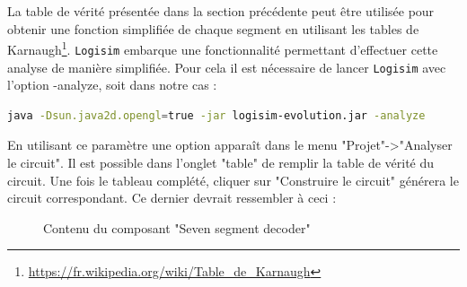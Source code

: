 \documentclass{article}
\begin{document}
    La table de vérité présentée dans la section précédente peut être utilisée pour obtenir une fonction simplifiée de chaque segment en utilisant les tables de Karnaugh\footnote{\url{https://fr.wikipedia.org/wiki/Table_de_Karnaugh}}.
    \texttt{Logisim} embarque une fonctionnalité permettant d'effectuer cette analyse de manière simplifiée.
    Pour cela il est nécessaire de lancer \texttt{Logisim} avec l'option -analyze, soit dans notre cas :

    \begin{lstlisting}[language=bash]
java -Dsun.java2d.opengl=true -jar logisim-evolution.jar -analyze
    \end{lstlisting}

    En utilisant ce paramètre une option apparaît dans le menu "Projet"->"Analyser le circuit".
    Il est possible dans l'onglet "table" de remplir la table de vérité du circuit.
    Une fois le tableau complété, cliquer sur "Construire le circuit" générera le circuit correspondant.
    Ce dernier devrait ressembler à ceci :
    \begin{figure}[H]
        \caption{Contenu du composant "Seven segment decoder"}
    \end{figure}
\end{document}
